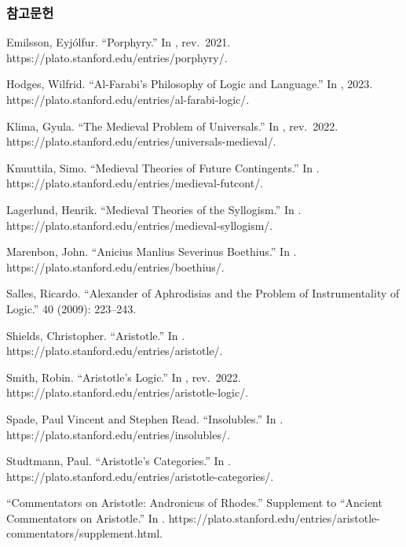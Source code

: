 \documentclass[12pt, a4paper]{article}
\begin{document}
\begin{references}
\subsubsection*{참고문헌}

 Emilsson, Eyjólfur. ``Porphyry.'' In , rev.\ 2021. https://plato.stanford.edu/entries/porphyry/.

 Hodges, Wilfrid. ``Al-Farabi's Philosophy of Logic and Language.'' In , 2023. https://plato.stanford.edu/entries/al-farabi-logic/.

 Klima, Gyula. ``The Medieval Problem of Universals.'' In , rev.\ 2022. https://plato.stanford.edu/entries/universals-medieval/.

 Knuuttila, Simo. ``Medieval Theories of Future Contingents.'' In . https://plato.stanford.edu/entries/medieval-futcont/.

 Lagerlund, Henrik. ``Medieval Theories of the Syllogism.'' In . https://plato.stanford.edu/entries/medieval-syllogism/.

 Marenbon, John. ``Anicius Manlius Severinus Boethius.'' In . https://plato.stanford.edu/entries/boethius/.

 Salles, Ricardo. ``Alexander of Aphrodisias and the Problem of Instrumentality of Logic.''  40 (2009): 223--243.

 Shields, Christopher. ``Aristotle.'' In .\\ https://plato.stanford.edu/entries/aristotle/.

 Smith, Robin. ``Aristotle's Logic.'' In , rev.\ 2022. https://plato.stanford.edu/entries/aristotle-logic/.

 Spade, Paul Vincent and Stephen Read. ``Insolubles.'' In . https://plato.stanford.edu/entries/insolubles/.

 Studtmann, Paul. ``Aristotle's Categories.'' In . https://plato.stanford.edu/entries/aristotle-categories/.

 ``Commentators on Aristotle: Andronicus of Rhodes.'' Supplement to ``Ancient Commentators on Aristotle.'' In . https://plato.stanford.edu/entries/aristotle-commentators/supplement.html.


\end{references}
\end{document}
